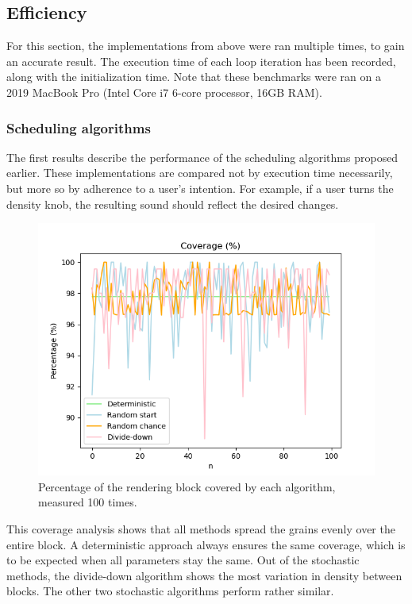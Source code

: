 \documentclass[10pt, twocolumn]{IEEEtran}
\begin{document}
\subsection{Efficiency}
For this section, the implementations from above were ran multiple times, to gain an accurate result. The execution time of each loop iteration has been recorded, along with the initialization time. Note that these benchmarks were ran on a 2019 MacBook Pro (Intel Core i7 6-core processor, 16GB RAM).

\subsubsection{Scheduling algorithms}
The first results describe the performance of the scheduling algorithms proposed earlier. These implementations are compared not by execution time necessarily, but more so by adherence to a user's intention. For example, if a user turns the density knob, the resulting sound should reflect the desired changes.\\
\begin{figure}[ht!]
	\includegraphics[width=\linewidth]{scd_coverage.png}
	\caption{Percentage of the rendering block covered by each algorithm, measured 100 times.}
	\label{fig:scd_coverage}
\end{figure}

This coverage analysis shows that all methods spread the grains evenly over the entire block. A deterministic approach always ensures the same coverage, which is to be expected when all parameters stay the same. Out of the stochastic methods, the divide-down algorithm shows the most variation in density between blocks. The other two stochastic algorithms perform rather similar.\\
\pagebreak
\end{document}
